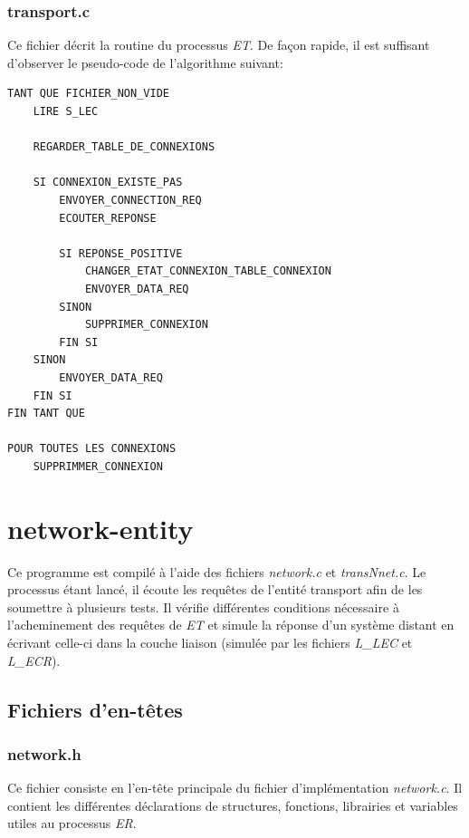 \documentclass[11pt,french]{article}
\begin{document}
        \subsubsection{transport.c} %
        \label{ssub:transport.c}
            Ce fichier décrit la routine du processus \emph{ET}. De façon rapide, il est suffisant d'observer le pseudo-code de l'algorithme suivant:
\begin{lstlisting}
TANT QUE FICHIER_NON_VIDE
    LIRE S_LEC
    
    REGARDER_TABLE_DE_CONNEXIONS
    
    SI CONNEXION_EXISTE_PAS
        ENVOYER_CONNECTION_REQ
        ECOUTER_REPONSE
        
        SI REPONSE_POSITIVE
            CHANGER_ETAT_CONNEXION_TABLE_CONNEXION
            ENVOYER_DATA_REQ
        SINON
            SUPPRIMER_CONNEXION
        FIN SI
    SINON
        ENVOYER_DATA_REQ
    FIN SI
FIN TANT QUE

POUR TOUTES LES CONNEXIONS
    SUPPRIMMER_CONNEXION
\end{lstlisting}
            

    \section{network-entity} %
    \label{sec:network-entity}
        Ce programme est compilé à l'aide des fichiers \emph{network.c} et \emph{transNnet.c}. Le processus étant lancé, il écoute les requêtes de l'entité transport afin de les soumettre
        à plusieurs tests. Il vérifie différentes conditions nécessaire à l'acheminement des requêtes de \emph{ET} et simule la réponse d'un système distant en écrivant celle-ci dans la
        couche liaison (simulée par les fichiers \emph{L\_LEC} et \emph{L\_ECR}).

        \subsection{Fichiers d'en-têtes} %
        \label{sub:Fichiers d'en-têtes}
        
            \subsubsection{network.h} %
            \label{ssub:network.h}
                Ce fichier consiste en l'en-tête principale du fichier d'implémentation \emph{network.c}. Il contient les différentes déclarations de structures, fonctions, librairies et variables
                utiles au processus \emph{ER}.\\
\end{document}
